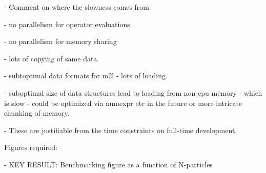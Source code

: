 - Comment on where the slowness comes from

- no parallelism for operator evaluations

- no parallelism for memory sharing

- lots of copying of same data.

- subtoptimal data formats for m2l - lots of loading.

- suboptimal size of data structures lead to loading from non-cpu memory - which is slow - could be optimized via numexpr etc in the future or more intricate chunking of memory.

- These are justifiable from the time constraints on full-time development.

Figures required:

- KEY RESULT: Benchmarking figure as a function of N-particles
